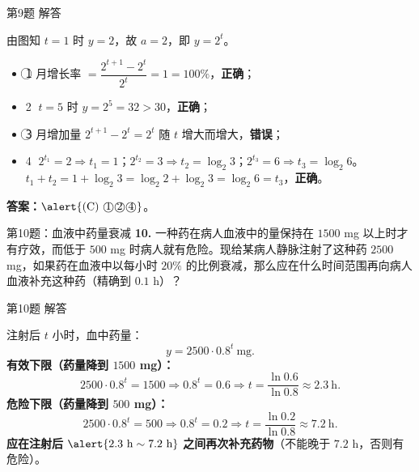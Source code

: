 \documentclass[10pt,aspectratio=169,serif]{beamer}
\begin{document}
\begin{frame}[t]{第9题 解答}
\begin{tcolorbox}[colback=orange!10,colframe=orange,title=\textbf{解}]
由图知 $t=1$ 时 $y=2$，故 $a=2$，即 $y=2^{t}$。
\smallskip
\begin{itemize}
  \item \textcircled{1} 月增长率 $=\dfrac{2^{t+1}-2^{t}}{2^{t}}=1=100\%$，\textbf{正确}；
  \item \textcircled{2} $t=5$ 时 $y=2^{5}=32>30$，\textbf{正确}；
  \item \textcircled{3} 月增加量 $2^{t+1}-2^{t}=2^{t}$ 随 $t$ 增大而增大，\textbf{错误}；
  \item \textcircled{4} $2^{t_{1}}=2\Rightarrow t_{1}=1$；$2^{t_{2}}=3\Rightarrow t_{2}=\log_{2}3$；$2^{t_{3}}=6\Rightarrow t_{3}=\log_{2}6$。
  $t_{1}+t_{2}=1+\log_{2}3=\log_{2}2+\log_{2}3=\log_{2}6=t_{3}$，\textbf{正确}。
\end{itemize}
\textbf{答案：}$\alert{\text{(C) \textcircled{1}\textcircled{2}\textcircled{4}}}$。
\end{tcolorbox}
\end{frame}

\begin{frame}[t]{第10题：血液中药量衰减}
\textbf{10.} 一种药在病人血液中的量保持在 $1500$ mg 以上时才有疗效，而低于 $500$ mg 时病人就有危险。现给某病人静脉注射了这种药 $2500$ mg，如果药在血液中以每小时 $20\%$ 的比例衰减，那么应在什么时间范围再向病人血液补充这种药（精确到 $0.1$ h）？
\end{frame}

\begin{frame}[t]{第10题 解答}
\begin{tcolorbox}[colback=orange!10,colframe=orange,title=\textbf{解}]
注射后 $t$ 小时，血中药量：
\[
y=2500\cdot 0.8^{t}\ \text{mg}.
\]
\textbf{有效下限（药量降到 $1500$ mg）：}
\[
2500\cdot 0.8^{t}=1500\Rightarrow 0.8^{t}=0.6
\Rightarrow t=\frac{\ln 0.6}{\ln 0.8}\approx 2.3\ \text{h}.
\]
\textbf{危险下限（药量降到 $500$ mg）：}
\[
2500\cdot 0.8^{t}=500\Rightarrow 0.8^{t}=0.2
\Rightarrow t=\frac{\ln 0.2}{\ln 0.8}\approx 7.2\ \text{h}.
\]
\smallskip
\textbf{应在注射后 } $\alert{2.3\text{ h} \sim 7.2\text{ h}}$ \textbf{之间再次补充药物}（不能晚于 $7.2$ h，否则有危险）。
\end{tcolorbox}
\end{frame}
\end{document}
